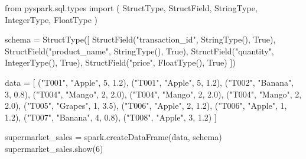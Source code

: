 \documentclass[
  11pt,
  letterpaper,
  DIV=11,
  numbers=noendperiod]{scrreprt}
\newenvironment{Shaded}{\begin{snugshade}}{\end{snugshade}}
\newcommand{\DecValTok}[1]{\textcolor[rgb]{0.68,0.00,0.00}{#1}}
\newcommand{\FloatTok}[1]{\textcolor[rgb]{0.68,0.00,0.00}{#1}}
\newcommand{\ImportTok}[1]{\textcolor[rgb]{0.00,0.46,0.62}{#1}}
\newcommand{\NormalTok}[1]{\textcolor[rgb]{0.00,0.23,0.31}{#1}}
\newcommand{\OperatorTok}[1]{\textcolor[rgb]{0.37,0.37,0.37}{#1}}
\newcommand{\StringTok}[1]{\textcolor[rgb]{0.13,0.47,0.30}{#1}}
\newcommand{\VariableTok}[1]{\textcolor[rgb]{0.07,0.07,0.07}{#1}}
\begin{document}
\begin{Shaded}
\begin{Highlighting}[]
\ImportTok{from}\NormalTok{ pyspark.sql.types }\ImportTok{import}\NormalTok{ (}
\NormalTok{    StructType, StructField,}
\NormalTok{    StringType, IntegerType,}
\NormalTok{    FloatType}
\NormalTok{)}

\NormalTok{schema }\OperatorTok{=}\NormalTok{ StructType([}
\NormalTok{    StructField(}\StringTok{"transaction\_id"}\NormalTok{, StringType(), }\VariableTok{True}\NormalTok{),}
\NormalTok{    StructField(}\StringTok{"product\_name"}\NormalTok{, StringType(), }\VariableTok{True}\NormalTok{),}
\NormalTok{    StructField(}\StringTok{"quantity"}\NormalTok{, IntegerType(), }\VariableTok{True}\NormalTok{),}
\NormalTok{    StructField(}\StringTok{"price"}\NormalTok{, FloatType(), }\VariableTok{True}\NormalTok{)}
\NormalTok{])}

\NormalTok{data }\OperatorTok{=}\NormalTok{ [}
\NormalTok{    (}\StringTok{"T001"}\NormalTok{, }\StringTok{"Apple"}\NormalTok{, }\DecValTok{5}\NormalTok{, }\FloatTok{1.2}\NormalTok{),}
\NormalTok{    (}\StringTok{"T001"}\NormalTok{, }\StringTok{"Apple"}\NormalTok{, }\DecValTok{5}\NormalTok{, }\FloatTok{1.2}\NormalTok{),}
\NormalTok{    (}\StringTok{"T002"}\NormalTok{, }\StringTok{"Banana"}\NormalTok{, }\DecValTok{3}\NormalTok{, }\FloatTok{0.8}\NormalTok{),}
\NormalTok{    (}\StringTok{"T004"}\NormalTok{, }\StringTok{"Mango"}\NormalTok{, }\DecValTok{2}\NormalTok{, }\FloatTok{2.0}\NormalTok{),}
\NormalTok{    (}\StringTok{"T004"}\NormalTok{, }\StringTok{"Mango"}\NormalTok{, }\DecValTok{2}\NormalTok{, }\FloatTok{2.0}\NormalTok{),}
\NormalTok{    (}\StringTok{"T004"}\NormalTok{, }\StringTok{"Mango"}\NormalTok{, }\DecValTok{2}\NormalTok{, }\FloatTok{2.0}\NormalTok{),}
\NormalTok{    (}\StringTok{"T005"}\NormalTok{, }\StringTok{"Grapes"}\NormalTok{, }\DecValTok{1}\NormalTok{, }\FloatTok{3.5}\NormalTok{),}
\NormalTok{    (}\StringTok{"T006"}\NormalTok{, }\StringTok{"Apple"}\NormalTok{, }\DecValTok{2}\NormalTok{, }\FloatTok{1.2}\NormalTok{),}
\NormalTok{    (}\StringTok{"T006"}\NormalTok{, }\StringTok{"Apple"}\NormalTok{, }\DecValTok{1}\NormalTok{, }\FloatTok{1.2}\NormalTok{),}
\NormalTok{    (}\StringTok{"T007"}\NormalTok{, }\StringTok{"Banana"}\NormalTok{, }\DecValTok{4}\NormalTok{, }\FloatTok{0.8}\NormalTok{),}
\NormalTok{    (}\StringTok{"T008"}\NormalTok{, }\StringTok{"Apple"}\NormalTok{, }\DecValTok{3}\NormalTok{, }\FloatTok{1.2}\NormalTok{)}
\NormalTok{]}

\NormalTok{supermarket\_sales }\OperatorTok{=}\NormalTok{ spark.createDataFrame(data, schema)}
\NormalTok{supermarket\_sales.show(}\DecValTok{6}\NormalTok{)}
\end{Highlighting}
\end{Shaded}
\end{document}
